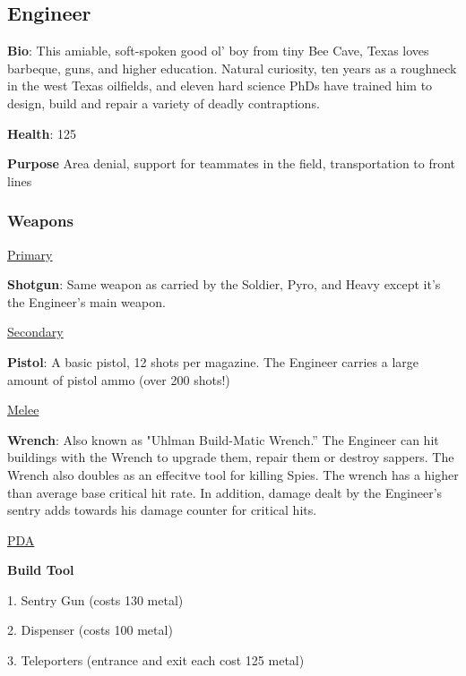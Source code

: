 \subsection{Engineer}
\label{Engineer}
{\bf Bio}:
This amiable, soft-spoken good ol' boy from tiny Bee Cave, Texas loves barbeque, guns, and higher education. Natural curiosity, ten years as a roughneck in the west Texas oilfields, and eleven hard science PhDs have trained him to design, build and repair a variety of deadly contraptions.

{\bf Health}: 125

{\bf Purpose}
Area denial, support for teammates in the field, transportation to front lines

\subsubsection {Weapons}


\begin {center}
\underline {Primary}
\end {center}

{\bf Shotgun}: Same weapon as carried by the Soldier, Pyro, and Heavy except it's the Engineer's main weapon.


\begin {center}
\underline {Secondary}
\end {center}

{\bf Pistol}: A basic pistol, 12 shots per magazine. The Engineer carries a large amount of pistol ammo (over 200 shots!)


\begin {center}
\underline {Melee}
\end {center}

{\bf Wrench}: Also known as "Uhlman Build-Matic Wrench.” The Engineer can hit buildings with the Wrench to upgrade them, repair them or destroy sappers. The Wrench also doubles as an effecitve tool for killing Spies. The wrench has a higher than average base critical hit rate.  In addition, damage dealt by the Engineer's sentry adds towards his damage counter for critical hits.


\begin {center}
\underline {PDA}
\end {center}
{\bf Build Tool}

1.       Sentry Gun (costs 130 metal)

2.       Dispenser (costs 100 metal)

3.       Teleporters (entrance and exit each cost 125 metal)



